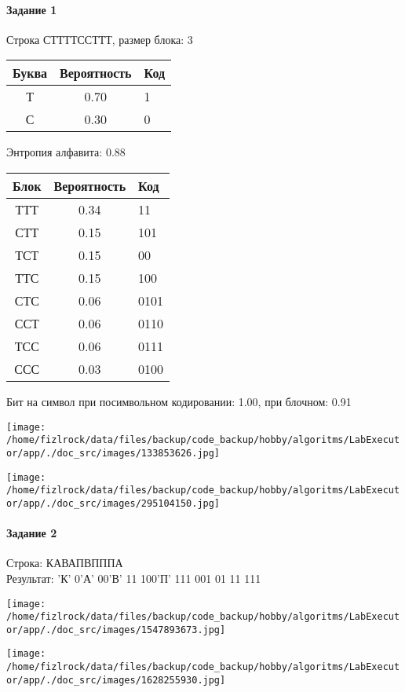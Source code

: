 \documentclass[a4paper, 12pt]{article}
\begin{document}
\paragraph{Задание 1}

Строка СТТТТССТТТ, размер блока: 3
\begin{center}
 \begin{tabular}{ |c|c|l| } 
  \hline
     Буква & Вероятность & Код\\ \hline
Т & 0.70 & 1\\\hline
С & 0.30 & 0
\\ \hline \end{tabular}
\end{center}
Энтропия алфавита: 0.88
\begin{center}
 \begin{tabular}{ |c|c|l| } 
  \hline
     Блок & Вероятность & Код\\ \hline
ТТТ & 0.34 & 11\\\hline
СТТ & 0.15 & 101\\\hline
ТСТ & 0.15 & 00\\\hline
ТТС & 0.15 & 100\\\hline
СТС & 0.06 & 0101\\\hline
ССТ & 0.06 & 0110\\\hline
ТСС & 0.06 & 0111\\\hline
ССС & 0.03 & 0100
\\ \hline \end{tabular}
\end{center}
Бит на символ при посимвольном кодировании: 1.00, при блочном: 0.91

\texttt{[image: /home/fizlrock/data/files/backup/code\_backup/hobby/algoritms/LabExecutor/app/./doc\_src/images/133853626.jpg]}

\texttt{[image: /home/fizlrock/data/files/backup/code\_backup/hobby/algoritms/LabExecutor/app/./doc\_src/images/295104150.jpg]}
\pagebreak
\paragraph{Задание 2}

Строка: 
КАВАПВПППА\\
Результат: 'К' 0'А' 00'В' 11 100'П' 111 001 01 11 111

\texttt{[image: /home/fizlrock/data/files/backup/code\_backup/hobby/algoritms/LabExecutor/app/./doc\_src/images/1547893673.jpg]}

\texttt{[image: /home/fizlrock/data/files/backup/code\_backup/hobby/algoritms/LabExecutor/app/./doc\_src/images/1628255930.jpg]}
\end{document}
